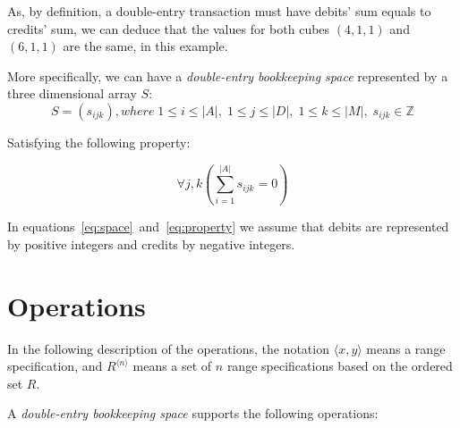 \documentclass{article}
\begin{document}
As, by definition, a double-entry transaction must have debits' sum
equals to credits' sum, we can deduce that the values for both
cubes $(4,1,1)$ and $(6,1,1)$ are the same, in this example.

More specifically, we can have a \emph{double-entry bookkeeping space} 
represented by a three dimensional array $S$:
\begin{equation}
	\label{eq:space}
	S = \left(s_{ijk}\right), where
	\; 1 \leq i \leq |A|, \; 1 \leq j \leq |D|, \; 1 \leq k \leq |M|, 
	\; s_{ijk} \in \mathbb{Z}
\end{equation}

Satisfying the following property:

\begin{equation}
	\label{eq:property}
	\forall j, k\left(\sum_{i=1}^{|A|}{s_{ijk}} = 0\right)
\end{equation}

In equations~\eqref{eq:space}~and~\eqref{eq:property}
we assume that debits are represented by positive integers
and credits by negative integers.

\section{Operations}

In the following description of the operations, the notation $\langle x, y \rangle$ means
a range specification, and $R^{\langle n \rangle}$ means a set of $n$
range specifications based on the ordered set $R$.

A \emph{double-entry bookkeeping space} supports the following operations:
\end{document}
